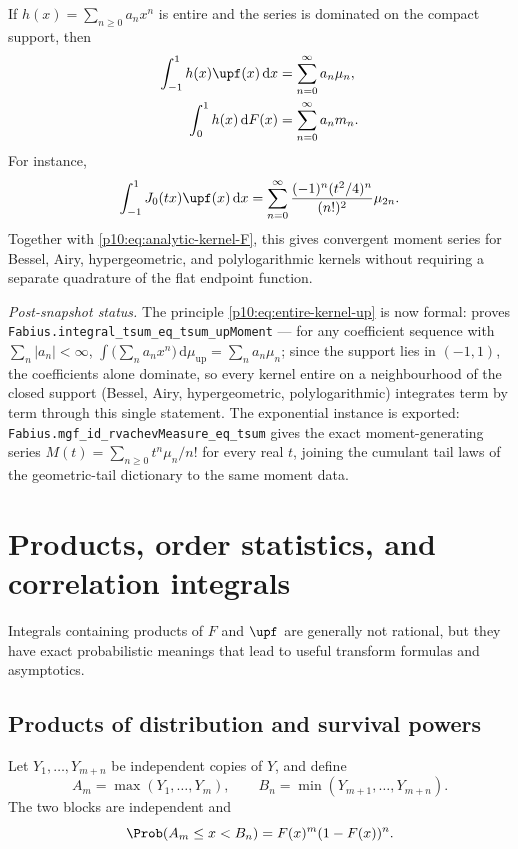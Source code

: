\documentclass[11pt,oneside]{article}
\theoremstyle{definition}
\theoremstyle{remark}
\newcommand{\F}{F}
\newcommand{\Up}{\operatorname{up}}
\newcommand{\dd}{\,\mathrm d}
\newcommand{\1}{\mathbf 1}
\begin{document}
If \(h(x)=\sum_{n\ge0}a_nx^n\) is entire and the series is dominated on the compact
support, then
\begin{align}
 \int_{-1}^1h(x)\upf(x)\dd x
 &=\sum_{n=0}^{\infty}a_n\mu_n,
 \label{p10:eq:entire-kernel-up}\\
 \int_0^1h(x)\dd\F(x)
 &=\sum_{n=0}^{\infty}a_nm_n.
 \label{p10:eq:entire-kernel-dF}
\end{align}
For instance,
\begin{equation}\label{p10:eq:Bessel-up}
 \int_{-1}^1J_0(tx)\upf(x)\dd x
 =\sum_{n=0}^{\infty}
 \frac{(-1)^n(t^2/4)^n}{(n!)^2}\mu_{2n}.
\end{equation}
Together with \cref{p10:eq:analytic-kernel-F}, this gives convergent moment series for
Bessel, Airy, hypergeometric, and polylogarithmic kernels without requiring a separate
quadrature of the flat endpoint function.

\emph{Post-snapshot status.}  The principle \eqref{p10:eq:entire-kernel-up} is now formal:
 proves
\nolinkurl{Fabius.integral\_tsum\_eq\_tsum\_upMoment} --- for any coefficient sequence with
\(\sum_n|a_n|<\infty\), \(\int\bigl(\sum_na_nx^n\bigr)\dd\mu_{\Up}=\sum_na_n\mu_n\); since the support lies
in \((-1,1)\), the coefficients alone dominate, so every kernel entire on a
neighbourhood of the closed support (Bessel, Airy, hypergeometric,
polylogarithmic) integrates term by term through this single statement.  The
exponential instance is exported: \nolinkurl{Fabius.mgf\_id\_rvachevMeasure\_eq\_tsum}
gives the exact moment-generating series \(M(t)=\sum_{n\ge0}t^n\mu_n/n!\) for every real
\(t\), joining the cumulant tail laws of the geometric-tail dictionary to the same
moment data.

\section{Products, order statistics, and correlation integrals}

Integrals containing products of \(\F\) and \(\upf\) are generally not rational, but
they have exact probabilistic meanings that lead to useful transform formulas and
asymptotics.

\subsection{Products of distribution and survival powers}

Let \(Y_1,\ldots,Y_{m+n}\) be independent copies of \(Y\), and define
\begin{equation}\label{p10:eq:Amax-Bmin}
 A_m=\max(Y_1,\ldots,Y_m),
 \qquad
 B_n=\min(Y_{m+1},\ldots,Y_{m+n}).
\end{equation}
The two blocks are independent and
\begin{equation}\label{p10:eq:gap-event}
 \Prob(A_m\le x<B_n)=\F(x)^m(1-\F(x))^n.
\end{equation}
\end{document}
